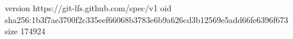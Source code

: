 version https://git-lfs.github.com/spec/v1
oid sha256:1b3f7ae3700f2c335eef66068b3783e6b9a626cd3b12569e5add66fe6396f673
size 174924
